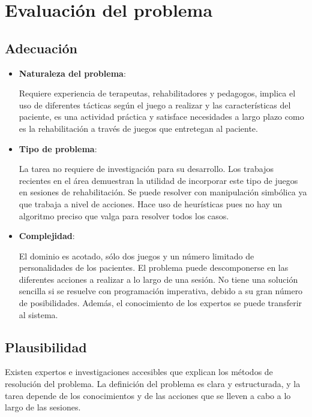 \documentclass{uc3mpracticas}
\begin{document}
  \section{Evaluación del problema}
  \subsection{Adecuación}

  \begin{itemize}
    \item \textbf{Naturaleza del problema}:

    Requiere experiencia de terapeutas, rehabilitadores y pedagogos, implica el uso de diferentes tácticas según el juego a realizar y las características del paciente, es una actividad práctica y satisface necesidades a largo plazo como es la rehabilitación a través de juegos que entretegan al paciente.

    \item \textbf{Tipo de problema}:

    La tarea no requiere de investigación para su desarrollo. Los trabajos recientes en el área demuestran la utilidad de incorporar este tipo de juegos en sesiones de rehabilitación. Se puede resolver con manipulación simbólica ya que trabaja a nivel de acciones. Hace uso de heurísticas pues no hay un algoritmo preciso que valga para resolver todos los casos.

    \item \textbf{Complejidad}:

    El dominio es acotado, sólo dos juegos y un número limitado de personalidades de los pacientes. El problema puede descomponerse en las diferentes acciones a realizar a lo largo de una sesión. No tiene una solución sencilla si se resuelve con programación imperativa, debido a su gran número de posibilidades. Además, el conocimiento de los expertos se puede transferir al sistema.
  \end{itemize}

  \subsection{Plausibilidad}

  Existen expertos e investigaciones accesibles que explican los métodos de resolución del problema. La definición del problema es clara y estructurada, y la tarea depende de los conocimientos y de las acciones que se lleven a cabo a lo largo de las sesiones.
\end{document}
